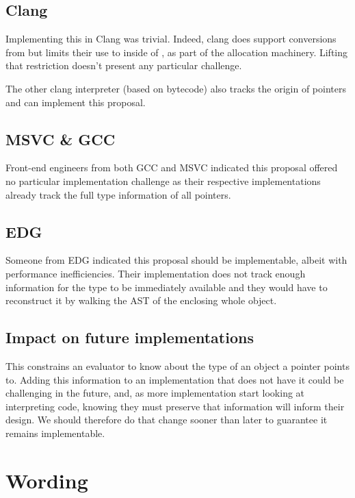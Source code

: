 \documentclass{wg21}
\begin{document}
    \subsection{Clang}

    Implementing this in Clang was trivial. Indeed, clang does support  conversions from  but limits their use to inside of , as part of the  allocation machinery. Lifting that restriction doesn't present any particular challenge.

    The other clang  interpreter (based on bytecode) also tracks the origin of pointers and can implement this proposal.

    \subsection{MSVC \& GCC}

    Front-end engineers from both GCC and MSVC indicated this proposal offered no particular implementation challenge as their respective implementations already track the full type information of all pointers.

    \subsection{EDG}

    Someone from EDG indicated this proposal should be implementable, albeit with performance inefficiencies. Their implementation does not track enough information for the type to be immediately available and they would have to reconstruct it by walking the AST of the enclosing whole object.


    \subsection{Impact on future implementations}

    This constrains an evaluator to know about the type of an object a pointer points to.
    Adding this information to an implementation that does not have it could be challenging in the future, and, as more implementation start looking at
    interpreting  code, knowing they must preserve that information will inform their design. We should therefore do that change sooner than later to guarantee it remains implementable.

    \section{Wording}
\end{document}
